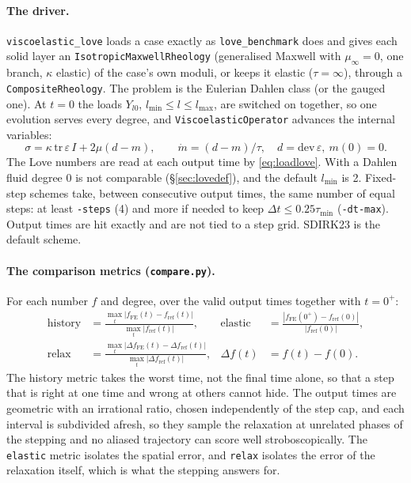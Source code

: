 \documentclass[11pt]{article}
\numberwithin{equation}{section}
\newcommand{\code}[1]{\texttt{#1}}
\begin{document}
\paragraph{The driver.}
\code{viscoelastic\_love} loads a case exactly as \code{love\_benchmark}
does and gives each solid layer an \code{IsotropicMaxwellRheology}
(generalised Maxwell with $\mu_\infty=0$, one branch, $\kappa$ elastic) of
the case's own moduli, or keeps it elastic ($\tau=\infty$), through a
\code{CompositeRheology}. The problem is the Eulerian Dahlen class (or the
gauged one). At $t=0$ the loads $Y_{l0}$, $l_{\min}\le l\le l_{\max}$, are
switched on together, so one evolution serves every degree, and
\code{ViscoelasticOperator} advances the internal variables:
\begin{equation}
  \sigma = \kappa\,\mathrm{tr}\,\varepsilon\,I + 2\mu(d-m),\qquad
  \dot m = (d-m)/\tau,\quad d=\mathrm{dev}\,\varepsilon,\ m(0)=0 .
\end{equation}
The Love numbers are read at each output time by \eqref{eq:loadlove}.
With a Dahlen fluid degree 0 is not comparable (\S\ref{sec:lovedef}), and
the default $l_{\min}$ is 2. Fixed-step schemes take, between consecutive
output times, the same number of equal steps: at least \code{-steps} (4)
and more if needed to keep $\Delta t\le0.25\tau_{\min}$
(\code{-dt-max}). Output times are hit exactly and are not tied to a step
grid. SDIRK23 is the default scheme.

\paragraph{The comparison metrics (\code{compare.py}).}
For each number $f$ and degree, over the valid output times together
with $t=0^+$:
\begin{align}
  \text{history} &= \frac{\max_t|f_{\text{FE}}(t)-f_{\text{ref}}(t)|}{\max_t|f_{\text{ref}}(t)|}, &
  \text{elastic} &= \frac{|f_{\text{FE}}(0^+)-f_{\text{ref}}(0)|}{|f_{\text{ref}}(0)|}, \\
  \text{relax} &= \frac{\max_t|\Delta f_{\text{FE}}(t)-\Delta f_{\text{ref}}(t)|}{\max_t|\Delta f_{\text{ref}}(t)|},
    & \Delta f(t) &= f(t)-f(0).
\end{align}
The history metric takes the worst time, not the final time alone, so
that a step that is right at one time and wrong at others cannot hide.
The output times are geometric with an irrational ratio, chosen
independently of the step cap, and each interval is subdivided afresh, so
they sample the relaxation at unrelated phases of the stepping and no
aliased trajectory can score well stroboscopically. The \code{elastic}
metric isolates the spatial error, and \code{relax} isolates the error of
the relaxation itself, which is what the stepping answers for.
\end{document}
